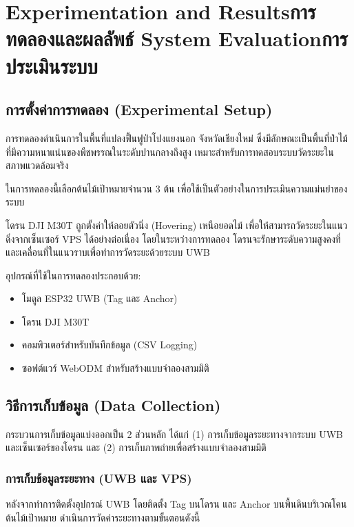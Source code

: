 \chapter{\ifproject%
\ifenglish Experimentation and Results\else การทดลองและผลลัพธ์\fi
\else%
\ifenglish System Evaluation\else การประเมินระบบ\fi
\fi}

\section{การตั้งค่าการทดลอง (Experimental Setup)}

การทดลองดำเนินการในพื้นที่แปลงฟื้นฟูป่าโปงแยงนอก จังหวัดเชียงใหม่ 
ซึ่งมีลักษณะเป็นพื้นที่ป่าไม้ที่มีความหนาแน่นของพืชพรรณในระดับปานกลางถึงสูง 
เหมาะสำหรับการทดสอบระบบวัดระยะในสภาพแวดล้อมจริง

ในการทดลองนี้เลือกต้นไม้เป้าหมายจำนวน 3 ต้น 
เพื่อใช้เป็นตัวอย่างในการประเมินความแม่นยำของระบบ

โดรน DJI M30T ถูกตั้งค่าให้ลอยตัวนิ่ง (Hovering) เหนือยอดไม้ 
เพื่อให้สามารถวัดระยะในแนวดิ่งจากเซ็นเซอร์ VPS ได้อย่างต่อเนื่อง 
โดยในระหว่างการทดลอง โดรนจะรักษาระดับความสูงคงที่ 
และเคลื่อนที่ในแนวราบเพื่อทำการวัดระยะด้วยระบบ UWB

อุปกรณ์ที่ใช้ในการทดลองประกอบด้วย:
\begin{itemize}
    \item โมดูล ESP32 UWB (Tag และ Anchor)
    \item โดรน DJI M30T
    \item คอมพิวเตอร์สำหรับบันทึกข้อมูล (CSV Logging)
    \item ซอฟต์แวร์ WebODM สำหรับสร้างแบบจำลองสามมิติ
\end{itemize}

\section{วิธีการเก็บข้อมูล (Data Collection)}

กระบวนการเก็บข้อมูลแบ่งออกเป็น 2 ส่วนหลัก ได้แก่ 
(1) การเก็บข้อมูลระยะทางจากระบบ UWB และเซ็นเซอร์ของโดรน 
และ (2) การเก็บภาพถ่ายเพื่อสร้างแบบจำลองสามมิติ

\subsection{การเก็บข้อมูลระยะทาง (UWB และ VPS)}

หลังจากทำการติดตั้งอุปกรณ์ UWB โดยติดตั้ง Tag บนโดรน 
และ Anchor บนพื้นดินบริเวณโคนต้นไม้เป้าหมาย 
ดำเนินการวัดค่าระยะทางตามขั้นตอนดังนี้

